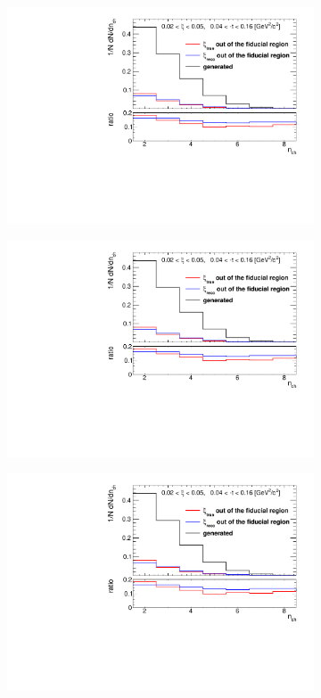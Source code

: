  \begin{figure}[h!]
 	\centering
 	\begin{subfigure}{.49\textwidth}
 		\includegraphics[width=\textwidth,page=1]{chapters/chrgSTAR/img/xiMigration/xi.pdf}
 	\end{subfigure}
 	\begin{subfigure}{.49\textwidth}
 		\includegraphics[width=\textwidth,page=2]{chapters/chrgSTAR/img/xiMigration/xi.pdf}
 	\end{subfigure}
 	\begin{subfigure}{.49\textwidth}
 		\includegraphics[width=\textwidth,page=3]{chapters/chrgSTAR/img/xiMigration/xi.pdf}

\end{subfigure}
\end{figure}

